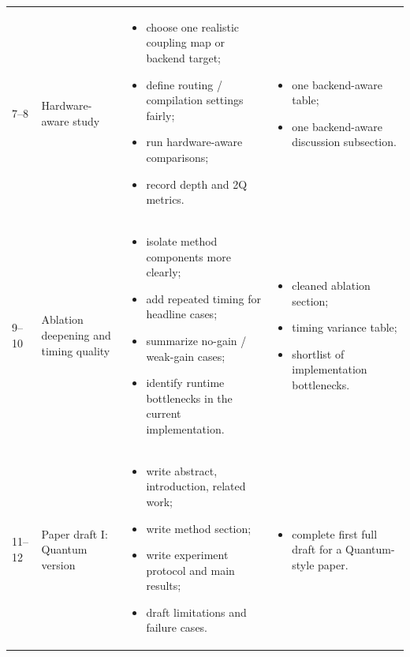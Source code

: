 \documentclass[11pt]{article}
\begin{document}
\begin{longtable}{p{} p{} p{} p{}}
7--8 &
Hardware-aware study &
\begin{itemize}
    \item choose one realistic coupling map or backend target;
    \item define routing / compilation settings fairly;
    \item run hardware-aware comparisons;
    \item record depth and 2Q metrics.
\end{itemize}
&
\begin{itemize}
    \item one backend-aware table;
    \item one backend-aware discussion subsection.
\end{itemize}
\\

9--10 &
Ablation deepening and timing quality &
\begin{itemize}
    \item isolate method components more clearly;
    \item add repeated timing for headline cases;
    \item summarize no-gain / weak-gain cases;
    \item identify runtime bottlenecks in the current implementation.
\end{itemize}
&
\begin{itemize}
    \item cleaned ablation section;
    \item timing variance table;
    \item shortlist of implementation bottlenecks.
\end{itemize}
\\

11--12 &
Paper draft I: Quantum version &
\begin{itemize}
    \item write abstract, introduction, related work;
    \item write method section;
    \item write experiment protocol and main results;
    \item draft limitations and failure cases.
\end{itemize}
&
\begin{itemize}
    \item complete first full draft for a Quantum-style paper.
\end{itemize}
\\


\end{longtable}
\end{document}
